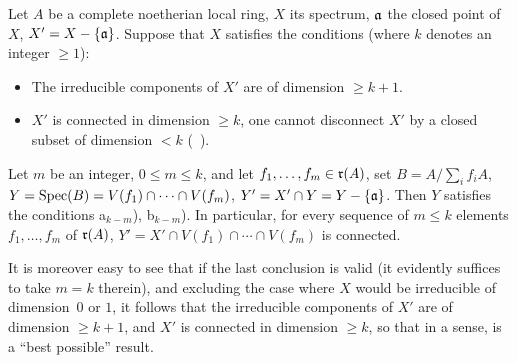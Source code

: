 \begin{theorem} \label{XIII.2.1}
Let $A$ be a complete noetherian local ring, $X$ its spectrum, $\mathfrak{a}$ the closed point of $X$, $X'=X-\{ \mathfrak{a}\}$. Suppose that $X$ satisfies the conditions (where $k$ denotes an integer $\ge 1$):
\begin{itemize}
\item[a$_k$)] The irreducible components of $X'$ are of dimension $\ge k+1$.

\item[b$_k$)] $X'$ is connected in dimension $\ge k$, \ie one cannot disconnect $X'$ by a closed subset of dimension $<k$ (\cf {}~).
\end{itemize}

Let $m$ be an integer, $0\le m\le k$, and let $f_1, \dotsc, f_m\in \mathfrak{r}(A)$, set $B=A/\sum_i f_iA$, $Y=\operatorname{Spec}(B)=V(f_1)\cap\dotsb\cap V(f_m)$, $Y'=X'\cap Y=Y-\{\mathfrak{a}\}$. Then $Y$ satisfies the conditions a$_{k-m}$), b$_{k-m}$). In particular, for every sequence of $m\le k$ elements $f_1, \dotsc, f_m$ of $\mathfrak{r}(A)$, $Y'=X'\cap V(f_1)\cap\dotsb\cap V(f_m)$ is connected.
\end{theorem}

It is moreover easy to see that if the last conclusion is valid (it evidently suffices to take $m=k$ therein), and excluding the case where $X$ would be irreducible of dimension~$0$ or $1$, it follows that the irreducible components of $X'$ are of dimension $\ge k+1$, and $X'$ is connected in dimension $\geq k$, so that in a sense,  is a ``best possible'' result.

\bigskip

